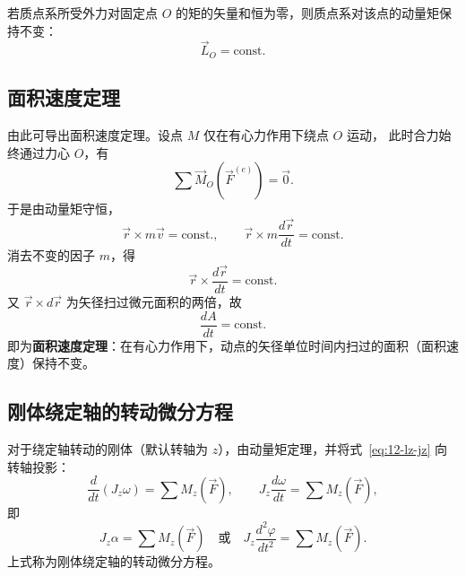 \begin{corollary}[动量矩守恒定律]
若质点系所受外力对固定点 $O$ 的矩的矢量和恒为零，则质点系对该点的动量矩保持不变：
\begin{equation}\label{eq:12-conservation}
  \vec{L}_O=\text{const.}
\end{equation}
\end{corollary}

\subsection{面积速度定理}

由此可导出面积速度定理。设点 $M$ 仅在有心力作用下绕点 $O$ 运动，
此时合力始终通过力心 $O$，有
\begin{equation}\label{eq:12-area-cond}
  \sum\vec{M}_O\left(\vec{F}^{(e)}\right)=\vec{0}.
\end{equation}
于是由动量矩守恒，
\begin{equation}\label{eq:12-rxmv-const}
  \vec{r}\times m\vec{v}=\text{const.},
  \qquad
  \vec{r}\times m\frac{d\vec{r}}{dt}=\text{const.}
\end{equation}
消去不变的因子 $m$，得
\begin{equation}\label{eq:12-rxdr-const}
  \vec{r}\times\frac{d\vec{r}}{dt}=\text{const.}
\end{equation}
又 $\vec{r}\times d\vec{r}$ 为矢径扫过微元面积的两倍，故
\begin{equation}\label{eq:12-area-speed}
  \frac{dA}{dt}=\text{const.}
\end{equation}
即为\textbf{面积速度定理}：在有心力作用下，动点的矢径单位时间内扫过的面积（面积速度）保持不变。

\subsection{刚体绕定轴的转动微分方程}

对于绕定轴转动的刚体（默认转轴为 $z$），由动量矩定理，并将式~\eqref{eq:12-lz-jz} 向转轴投影：
\begin{equation}\label{eq:12-fixedaxis-rate}
  \frac{d}{dt}(J_z\omega)=\sum M_z(\vec{F}),
  \qquad
  J_z\frac{d\omega}{dt}=\sum M_z(\vec{F}),
\end{equation}
即
\begin{equation}\label{eq:12-fixedaxis-eom}
  J_z\alpha=\sum M_z(\vec{F})
  \quad\text{或}\quad
  J_z\frac{d^2\varphi}{dt^2}=\sum M_z(\vec{F}).
\end{equation}
上式称为刚体绕定轴的转动微分方程。

